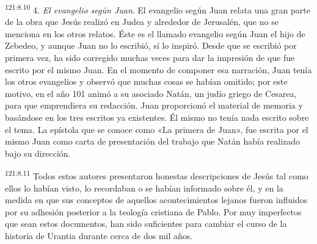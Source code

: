 \par 
\textsuperscript{121:8.10} 4. \textit{El evangelio según Juan}. El evangelio según Juan relata una gran parte de la obra que Jesús realizó en Judea y alrededor de Jerusalén, que no se menciona en los otros relatos. Éste es el llamado evangelio según Juan el hijo de Zebedeo, y aunque Juan no lo escribió, sí lo inspiró. Desde que se escribió por primera vez, ha sido corregido muchas veces para dar la impresión de que fue escrito por el mismo Juan. En el momento de componer esa narración, Juan tenía los otros evangelios y observó que muchas cosas se habían omitido; por este motivo, en el año 101 animó a su asociado Natán, un judío griego de Cesarea, para que emprendiera su redacción. Juan proporcionó el material de memoria y basándose en los tres escritos ya existentes. Él mismo no tenía nada escrito sobre el tema. La epístola que se conoce como «La primera de Juan», fue escrita por el mismo Juan como carta de presentación del trabajo que Natán había realizado bajo su dirección.

\par 
\textsuperscript{121:8.11} Todos estos autores presentaron honestas descripciones de Jesús tal como ellos lo habían visto, lo recordaban o se habían informado sobre él, y en la medida en que sus conceptos de aquellos acontecimientos lejanos fueron influidos por su adhesión posterior a la teología cristiana de Pablo. Por muy imperfectos que sean estos documentos, han sido suficientes para cambiar el curso de la historia de Urantia durante cerca de dos mil años.

